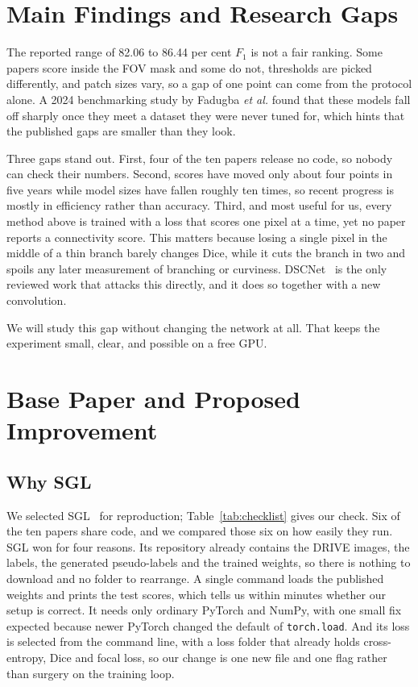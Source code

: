 \documentclass[conference]{IEEEtran}
\begin{document}
\section{Main Findings and Research Gaps}

The reported range of 82.06 to 86.44 per cent $F_1$ is not a fair ranking. Some
papers score inside the FOV mask and some do not, thresholds are picked
differently, and patch sizes vary, so a gap of one point can come from the
protocol alone. A 2024 benchmarking study by Fadugba \textit{et al.} found that
these models fall off sharply once they meet a dataset they were never tuned
for, which hints that the published gaps are smaller than they look.

Three gaps stand out. First, four of the ten papers release no code, so nobody
can check their numbers. Second, scores have moved only about four points in
five years while model sizes have fallen roughly ten times, so recent progress
is mostly in efficiency rather than accuracy. Third, and most useful for us,
every method above is trained with a loss that scores one pixel at a time, yet
no paper reports a connectivity score. This matters because losing a single
pixel in the middle of a thin branch barely changes Dice, while it cuts the
branch in two and spoils any later measurement of branching or curviness.
DSCNet~\cite{dscnet} is the only reviewed work that attacks this directly, and
it does so together with a new convolution.

We will study this gap without changing the network at all. That keeps the
experiment small, clear, and possible on a free GPU.

\section{Base Paper and Proposed Improvement}

\subsection{Why SGL}

We selected SGL~\cite{sgl} for reproduction; Table~\ref{tab:checklist} gives
our check. Six of the ten papers share code, and we compared those six on how
easily they run. SGL won for four reasons. Its repository already contains the
DRIVE images, the labels, the generated pseudo-labels and the trained weights,
so there is nothing to download and no folder to rearrange. A single command
loads the published weights and prints the test scores, which tells us within
minutes whether our setup is correct. It needs only ordinary PyTorch and NumPy,
with one small fix expected because newer PyTorch changed the default of
\texttt{torch.load}. And its loss is selected from the command line, with a
loss folder that already holds cross-entropy, Dice and focal loss, so our
change is one new file and one flag rather than surgery on the training loop.
\end{document}
